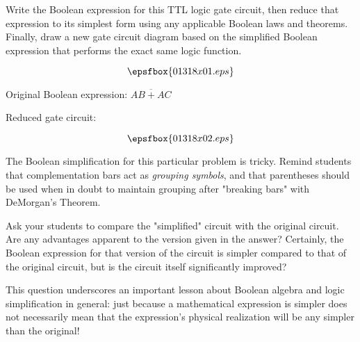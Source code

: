 

Write the Boolean expression for this TTL logic gate circuit, then reduce that expression to its simplest form using any applicable Boolean laws and theorems.  Finally, draw a new gate circuit diagram based on the simplified Boolean expression that performs the exact same logic function.

$$\epsfbox{01318x01.eps}$$







Original Boolean expression: $\overline{AB + AC}$

\vskip 10pt

Reduced gate circuit:

$$\epsfbox{01318x02.eps}$$







The Boolean simplification for this particular problem is tricky.  Remind students that complementation bars act as {\it grouping symbols}, and that parentheses should be used when in doubt to maintain grouping after "breaking bars" with DeMorgan's Theorem.

Ask your students to compare the "simplified" circuit with the original circuit.  Are any advantages apparent to the version given in the answer?  Certainly, the Boolean expression for that version of the circuit is simpler compared to that of the original circuit, but is the circuit itself significantly improved?

This question underscores an important lesson about Boolean algebra and logic simplification in general: just because a mathematical expression is simpler does not necessarily mean that the expression's physical realization will be any simpler than the original!




